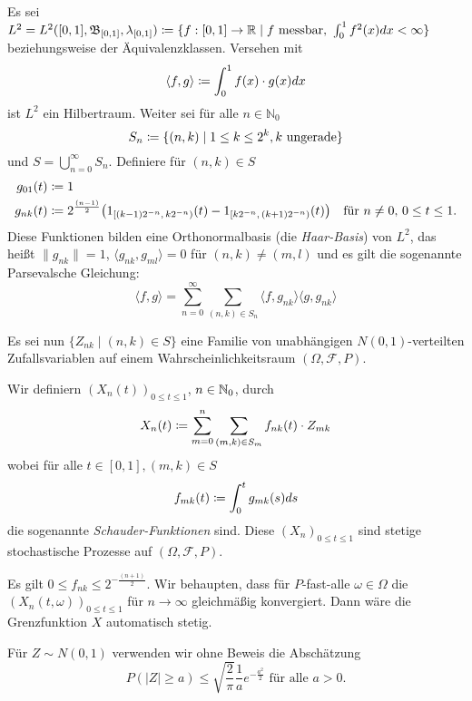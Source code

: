 \documentclass[a4paper,twoside,DIV15,BCOR12mm]{scrbook}
\newcommand{\cF}{\mathcal F}
\newcommand{\borel}{{\mathfrak B}}
\begin{document}
\begin{beweis}

Es sei $L^2=L^2([0,1],\borel_{[0,1]}, \lambda_{[0,1]}) \da \{f :[0,1]\to \MdR\mid f \text{ messbar, } \int_0^1 f^2(x)dx <\infty\}$ beziehungsweise der Äquivalenzklassen. Versehen mit
\[
\langle f,g \rangle \da \int_0^1 f(x)\cdot g(x) dx
\]
ist $L^2$ ein Hilbertraum. Weiter sei für alle $n\in \mathbb N_0$
\[
S_n\da\{(n,k) \mid 1\le k \le 2^k, k\text{ ungerade}\}
\]
und $S=\bigcup_{n=0}^\infty S_n$. Definiere für $(n,k)\in S$
\begin{align*}
g_{01}(t) &\da 1\\
g_{nk}(t) &\da 2^{\frac{(n-1)}2}\big( 1_{[(k-1)2^{-n},\,k2^{-n})}(t) - 1_{[k2^{-n},\,(k+1)2^{-n})}(t)\big) \quad \text{für } n\ne 0,\,0\le t\le 1.
\end{align*}
Diese Funktionen bilden eine Orthonormalbasis (die \emph{Haar-Basis}) von $L^2$, das heißt $\|g_{nk}\|=1$, $\langle g_{nk},g_{ml} \rangle = 0$ für $(n,k)\ne (m,l)$ und es gilt die sogenannte Parsevalsche Gleichung:
\[
\langle f,g\rangle = \sum_{n=0}^\infty \sum_{(n,k)\in S_n} \langle f,g_{nk}\rangle\langle g,g_{nk}\rangle
\]

Es sei nun $\{Z_{nk} \mid (n,k)\in S\}$ eine Familie von unabhängigen $N(0,1)$-verteilten Zufallsvariablen auf einem Wahrscheinlichkeitsraum $(\Omega, \cF, P)$.

Wir definiern $(X_n(t))_{0\le t\le 1}$, $n\in \mathbb{N}_0$, durch
\begin{align*}
X_n(t) \da \sum_{m=0}^n \sum_{(m,k)\in S_m} f_{nk}(t) \cdot Z_{mk}
\end{align*}
wobei für alle $t\in[0,1], (m,k)\in S$
\begin{align*}
f_{mk}(t) \da \int_0^t g_{mk}(s) ds 
\end{align*}
die sogenannte \emph{Schauder-Funktionen} sind. Diese $(X_n)_{0\le t\le 1}$ sind stetige stochastische Prozesse auf $(\Omega,\cF, P)$.

Es gilt $0\le f_{nk} \le 2^{-\frac{(n+1)}2}$. Wir behaupten, dass für $P$-fast-alle $\omega\in \Omega$ die $(X_n(t,\omega))_{0\le t\le 1}$ für $n\to\infty$ gleichmäßig konvergiert. Dann wäre die Grenzfunktion $X$ automatisch stetig.

Für $Z\sim N(0,1)$ verwenden wir ohne Beweis die Abschätzung
\[
P(|Z|\ge a) \le \sqrt {\frac2\pi}\frac 1a e^{-\frac{a^2}2}\text{ für alle }a>0.
\]


\end{beweis}
\end{document}
